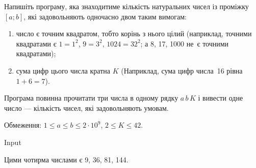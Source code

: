 ﻿ Напишіть програму, яка знаходитиме кількість натуральних чисел із проміжку $[a; b]$, які задовольняють одночасно двом таким вимогам:
\begin{enumerate}
\item
число є точним квадратом, тобто корінь з нього цілий (наприклад, точними квадратами є $1=1^2$, $9=3^2$, $1024=32^2$; а 8, 17, 1000 не~є точними квадратами);
\item
сума цифр цього числа кратна $K$ (Наприклад, сума цифр числа~16 рівна $1+6=7$).
\end{enumerate}

Програма повинна прочитати три числа в одному рядку $a\,b\,K$ і вивести одне число --- кількість чисел, які задовольняють умовам.

Обмеження: $1\leqslant a\leqslant b\leqslant 2\cdot10^9$, $2\leqslant K\leqslant 42$.

\Examples
Input
\begin{example}
\end{example}

\Note
Цими чотирма числами є 9, 36, 81, 144. 